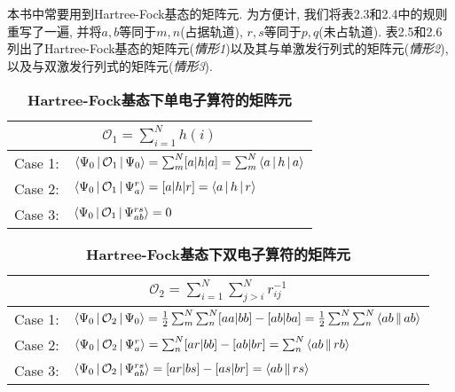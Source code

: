 
本书中常要用到Hartree-Fock基态的矩阵元. 为方便计, 我们将表2.3和2.4中的规则重写了一遍, 并将$a,b$等同于$m,n$(占据轨道), $r,s$等同于$p,q$(未占轨道). 表2.5和2.6列出了Hartree-Fock基态的矩阵元(\textit{情形1})以及其与单激发行列式的矩阵元(\textit{情形2}), 以及与双激发行列式的矩阵元(\textit{情形3}).
\begin{table}[h]
	\renewcommand\arraystretch{1.7}
	\centering
	\caption{\bf Hartree-Fock基态下单电子算符的矩阵元}
	\label{t2.5}
	\begin{tabularx}{\textwidth}{lY}
		\hline
		\\\hline
		Case 1: & $\Braket{\Psi_0|\mathcal{O}_1|\Psi_0} = \sum_m^N [a|h|a]=\sum_m^N\Braket{a|h|a}$\\
		Case 2: & $\Braket{\Psi_0|\mathcal{O}_1|\Psi_a^r} = [a|h|r]=\Braket{a|h|r}$\\
		Case 3: & $\Braket{\Psi_0|\mathcal{O}_1|\Psi_{ab}^{rs}} = 0$\\\hline
	\end{tabularx}
\end{table}

\begin{table}[h]
	\renewcommand\arraystretch{1.7}
	\centering
	\caption{\bf Hartree-Fock基态下双电子算符的矩阵元}
	\label{t2.6}
	\begin{tabularx}{\textwidth}{lY}
		\hline
		\\\hline
		Case 1: & $\Braket{\Psi_0|\mathcal{O}_2|\Psi_0} = \frac{1}{2}\sum_m^N\sum_n^N [aa|bb]-[ab|ba]=\frac{1}{2}\sum_m^N\sum_n^N\Braket{ab||ab}$\\
		Case 2: & $\Braket{\Psi_0|\mathcal{O}_2|\Psi_a^r} = \sum_n^N[ar|bb]-[ab|br]=\sum_n^N\Braket{ab||rb}$\\
		Case 3: & $\Braket{\Psi_0|\mathcal{O}_2|\Psi_{ab}^{rs}} = [ar|bs]-[as|br]=\Braket{ab||rs}$\\\hline
	\end{tabularx}
\end{table}


